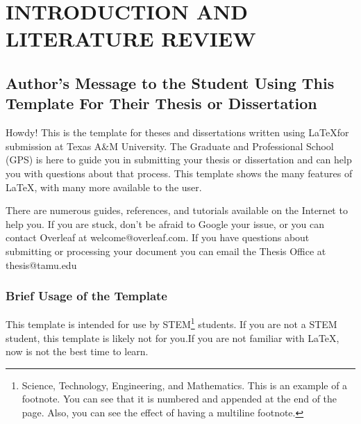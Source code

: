 %
%
%
%  
%



\pagestyle{plain} %
\setcounter{page}{1}


\chapter{\uppercase {Introduction and Literature Review}}

\section{Author's Message to the Student Using This Template For Their Thesis or Dissertation}

Howdy! This is the template for theses and dissertations written using \LaTeX for submission at Texas A\&M University. The Graduate and Professional School (GPS) is here to guide you in submitting your thesis or dissertation and can help you with questions about that process. This template shows the many features of \LaTeX, with many more available to the user.

There are numerous guides, references, and tutorials available on the Internet to help you. If you are stuck, don't be afraid to Google your issue, or you can contact Overleaf at welcome@overleaf.com. If you have questions about submitting or processing your document you can email the Thesis Office at thesis@tamu.edu


\subsection{Brief Usage of the Template}

This template is intended for use by STEM\footnote{Science, Technology, Engineering, and Mathematics. This is an example of a footnote. You can see that it is numbered and appended at the end of the page. Also, you can see the effect of having a multiline footnote.} students. If you are not a STEM student, this template is likely not for you.If you are not familiar with LaTeX, now is not the best time to learn.

